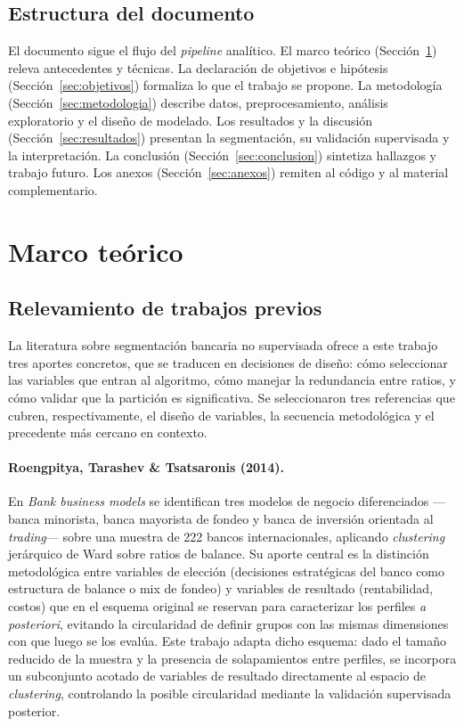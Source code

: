 \documentclass[11pt,a4paper]{article}
\begin{document}
\subsection{Estructura del documento}

El documento sigue el flujo del \textit{pipeline} analítico. El marco teórico
(Sección~\ref{sec:marco}) releva antecedentes y técnicas. La declaración de objetivos e
hipótesis (Sección~\ref{sec:objetivos}) formaliza lo que el trabajo se propone. La
metodología (Sección~\ref{sec:metodologia}) describe datos, preprocesamiento, análisis
exploratorio y el diseño de modelado. Los resultados y la discusión
(Sección~\ref{sec:resultados}) presentan la segmentación, su validación supervisada y la
interpretación. La conclusión (Sección~\ref{sec:conclusion}) sintetiza hallazgos y trabajo
futuro. Los anexos (Sección~\ref{sec:anexos}) remiten al código y al material complementario.

\section{Marco teórico}
\label{sec:marco}

\subsection{Relevamiento de trabajos previos}

La literatura sobre segmentación bancaria no supervisada ofrece a este trabajo tres aportes
concretos, que se traducen en decisiones de diseño: cómo seleccionar las variables que entran
al algoritmo, cómo manejar la redundancia entre ratios, y cómo validar que la partición es
significativa. Se seleccionaron tres referencias que cubren, respectivamente, el diseño de
variables, la secuencia metodológica y el precedente más cercano en contexto.

\paragraph{Roengpitya, Tarashev \& Tsatsaronis (2014).}
En \textit{Bank business models} \citep{roengpitya2014} se identifican tres modelos de negocio
diferenciados ---banca minorista, banca mayorista de fondeo y banca de inversión orientada al
\textit{trading}--- sobre una muestra de 222 bancos internacionales, aplicando \textit{clustering}
jerárquico de Ward sobre ratios de balance. Su aporte central es la distinción metodológica entre
variables de elección (decisiones estratégicas del banco como estructura de
balance o mix de fondeo) y variables de resultado (rentabilidad, costos) que en el
esquema original se reservan para caracterizar los perfiles \textit{a posteriori}, evitando la
circularidad de definir grupos con las mismas dimensiones con que luego se los evalúa. Este trabajo
adapta dicho esquema: dado el tamaño reducido de la
muestra y la presencia de solapamientos entre perfiles, se incorpora un subconjunto acotado de
variables de resultado directamente al espacio de \textit{clustering}, controlando la posible
circularidad mediante la validación supervisada posterior.
\end{document}

